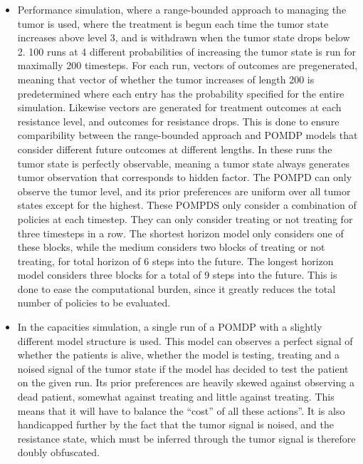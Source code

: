 \documentclass[notspecified,article,submit,moreauthors,pdftex]{Definitions/mdpi}
\begin{document}
\begin{itemize}
\item
  Performance simulation, where a range-bounded approach to managing the
  tumor is used, where the treatment is begun each time the tumor state
  increases above level 3, and is withdrawn when the tumor state drops
  below 2. 100 runs at 4 different probabilities of increasing the tumor
  state is run for maximally 200 timesteps. For each run, vectors of
  outcomes are pregenerated, meaning that vector of whether the tumor
  increases of length 200 is predetermined where each entry has the
  probability specified for the entire simulation. Likewise vectors are
  generated for treatment outcomes at each resistance level, and
  outcomes for resistance drops. This is done to ensure comparibility
  between the range-bounded approach and POMDP models that consider
  different future outcomes at different lengths. In these runs the
  tumor state is perfectly observable, meaning a tumor state always
  generates tumor observation that corresponds to hidden factor. The
  POMPD can only observe the tumor level, and its prior preferences are
  uniform over all tumor states except for the highest. These POMPDS
  only consider a combination of policies at each timestep. They can
  only consider treating or not treating for three timesteps in a row.
  The shortest horizon model only considers one of these blocks, while
  the medium considers two blocks of treating or not treating, for total
  horizon of 6 steps into the future. The longest horizon model
  considers three blocks for a total of 9 steps into the future. This is
  done to ease the computational burden, since it greatly reduces the
  total number of policies to be evaluated.
\item
  In the capacities simulation, a single run of a POMDP with a slightly
  different model structure is used. This model can observes a perfect
  signal of whether the patients is alive, whether the model is testing,
  treating and a noised signal of the tumor state if the model has
  decided to test the patient on the given run. Its prior preferences
  are heavily skewed against observing a dead patient, somewhat against
  treating and little against treating. This means that it will have to
  balance the ``cost'' of all these actions''. It is also handicapped
  further by the fact that the tumor signal is noised, and the
  resistance state, which must be inferred through the tumor signal is
  therefore doubly obfuscated.
\end{itemize}
\end{document}
